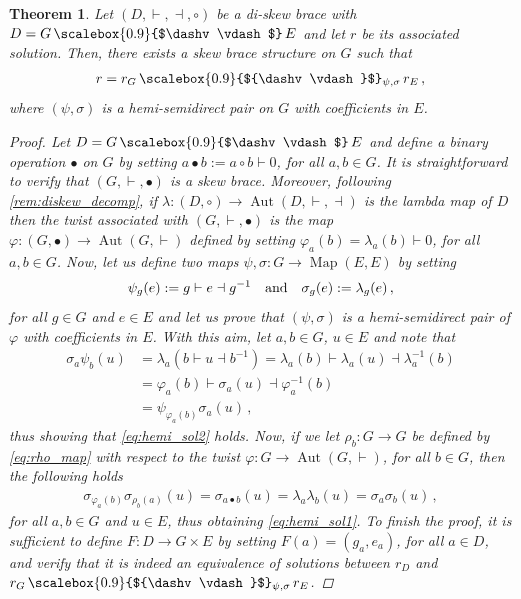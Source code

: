 \documentclass[preprint,1p]{elsarticle}
\numberwithin{equation}{section}
\newtheorem{theor}{Theorem}[section]
\theoremstyle{definition}               %
\newcommand{\vd}{\vdash}
\newcommand{\dv}{\dashv}
\DeclareMathOperator{\Aut}{Aut}
\DeclareMathOperator{\Map}{Map}
\begin{document}
\begin{theor}\label{theor:diskew_twist_decomp}
    Let $(D,\vd,\dv,\circ)$ be a di-skew brace with $D = G \,\text{\scalebox{0.9}{$\dv\vd$}}\, E$ and let $r$ be its associated solution.
    Then, there exists a skew brace structure on $G$ such that
    \begin{align*}
        r = r_G\, \text{\scalebox{0.9}{${\dv\vd}$}$_{\psi,\sigma}$}\, r_E \,,
    \end{align*}
    where $(\psi,\sigma)$ is a hemi-semidirect pair on $G$ with coefficients in $E$.
    \begin{proof}
        Let $D = G \,\text{\scalebox{0.9}{$\dv\vd$}}\, E$ and define a binary operation ${\bullet}$ on $G$ by setting $a \bullet b := a \circ b \vd 0$, for all $a,b \in G$.
        It is straightforward to verify that $(G,\vd,\bullet)$ is a skew brace. Moreover, following \cref{rem:diskew_decomp}, if $\lambda:(D,\circ) \to \Aut(D,\vd,\dv)$ is the lambda map of $D$ then the twist associated with $(G,\vd,\bullet)$ is the map $\varphi:(G,\bullet) \to \Aut(G,\vd)$ defined by setting $\varphi_a(b) = \lambda_a(b) \vd 0$, for all $a,b \in G$.
        Now, let us define two maps $\psi,\sigma:G \to \Map(E,E)$ by setting
        \begin{align*}
            \psi_g(e) := g \vd e \dv g^{-1}
            \quad\textnormal{and}\quad
            \sigma_g(e) := \lambda_g(e) \,,
        \end{align*}
        for all $g \in G$ and $e \in E$ and let us prove that $(\psi,\sigma)$ is a hemi-semidirect pair of $\varphi$ with coefficients in $E$.
        With this aim, let $a,b \in G$, $u \in E$ and note that
        \begin{align*}
            \sigma_a\psi_b(u) 
            &=
            \lambda_a(b \vd u \dv b^{-1})
            =
            \lambda_a(b) \vd \lambda_a(u) \dv \lambda_a^{-1}(b)\\
            &=
            \varphi_a(b) \vd \sigma_a(u) \dv \varphi_a^{-1}(b)\\
            &=
            \psi_{\varphi_a(b)}\sigma_a(u) \,,
        \end{align*}
        thus showing that \eqref{eq:hemi_sol2} holds.
        {Now, if we let $\rho_b:G \to G$ be defined by \eqref{eq:rho_map} with respect to the twist $\varphi:G \to \Aut(G,\vd)$, for all $b \in G$, then the following holds
        \begin{align*}
            \sigma_{\varphi_a(b)}\sigma_{\rho_b(a)}(u) 
            =
            \sigma_{a \bullet b}(u)
            =
            \lambda_a\lambda_b(u)
            =
            \sigma_a\sigma_b(u) \,,
        \end{align*}
        for all $a,b \in G$ and $u \in E$,} thus obtaining \eqref{eq:hemi_sol1}.
        To finish the proof, it is sufficient to define $F:D \to G \times E$ by setting $F(a) = (g_a,e_a)$, for all $a \in D$, and verify that it is indeed an equivalence of solutions between $r_D$ and $r_G\, \text{\scalebox{0.9}{${\dv\vd}$}$_{\psi,\sigma}$}\, r_E$.
    \end{proof}
\end{theor}
\end{document}
